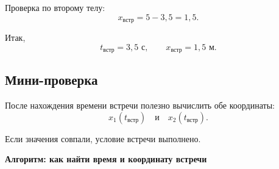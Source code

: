 \documentclass[a4paper,12pt]{article}
\begin{document}
Проверка по второму телу:
\[
x_{\text{встр}}=5-3{,}5=1{,}5.
\]

Итак,
\[
\boxed{t_{\text{встр}}=3{,}5\text{ с}},
\qquad
\boxed{x_{\text{встр}}=1{,}5\text{ м}}.
\]

\subsection*{Мини-проверка}

После нахождения времени встречи полезно вычислить обе координаты:
\[
x_1(t_{\text{встр}})
\quad\text{и}\quad
x_2(t_{\text{встр}}).
\]

Если значения совпали, условие встречи выполнено.


\clearpage
\thispagestyle{empty}

\begin{center}
{\LARGE\bfseries\color{darkaccent}
Алгоритм: как найти время и координату встречи}
\end{center}

\vspace{8mm}
\end{document}
